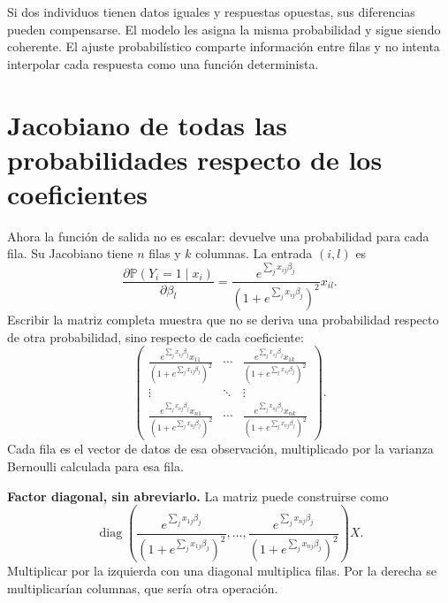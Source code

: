 \documentclass[11pt,a4paper]{article}
\newcommand{\Prob}{\mathbb P}
\DeclareMathOperator{\diag}{diag}
\begin{document}
Si dos individuos tienen datos iguales y respuestas opuestas,
sus diferencias pueden compensarse. El modelo les asigna la misma
probabilidad y sigue siendo coherente.
El ajuste probabilístico comparte información entre filas y no intenta
interpolar cada respuesta como una función determinista.

\clearpage
\section{Jacobiano de todas las probabilidades respecto de los coeficientes}\label{logit17}
Ahora la función de salida no es escalar: devuelve una probabilidad
para cada fila. Su Jacobiano tiene $n$ filas y $k$ columnas.
La entrada $(i,l)$ es
\[
\frac{\partial\Prob(Y_i=1\mid x_i)}{\partial\beta_l}
=\frac{e^{\sum_jx_{ij}\beta_j}}
{(1+e^{\sum_jx_{ij}\beta_j})^2}x_{il}.
\]
Escribir la matriz completa muestra que no se deriva una probabilidad
respecto de otra probabilidad, sino respecto de cada coeficiente:
\[
\begin{pmatrix}
\frac{e^{\sum_jx_{1j}\beta_j}x_{11}}{(1+e^{\sum_jx_{1j}\beta_j})^2}
&\cdots&
\frac{e^{\sum_jx_{1j}\beta_j}x_{1k}}{(1+e^{\sum_jx_{1j}\beta_j})^2}\\
\vdots&\ddots&\vdots\\
\frac{e^{\sum_jx_{nj}\beta_j}x_{n1}}{(1+e^{\sum_jx_{nj}\beta_j})^2}
&\cdots&
\frac{e^{\sum_jx_{nj}\beta_j}x_{nk}}{(1+e^{\sum_jx_{nj}\beta_j})^2}
\end{pmatrix}.
\]
Cada fila es el vector de datos de esa observación,
multiplicado por la varianza Bernoulli calculada para esa fila.

\textbf{Factor diagonal, sin abreviarlo.}
La matriz puede construirse como
\[
\diag\left(
\frac{e^{\sum_jx_{1j}\beta_j}}{(1+e^{\sum_jx_{1j}\beta_j})^2},
\ldots,
\frac{e^{\sum_jx_{nj}\beta_j}}{(1+e^{\sum_jx_{nj}\beta_j})^2}
\right)X.
\]
Multiplicar por la izquierda con una diagonal multiplica filas.
Por la derecha se multiplicarían columnas, que sería otra operación.
\end{document}
